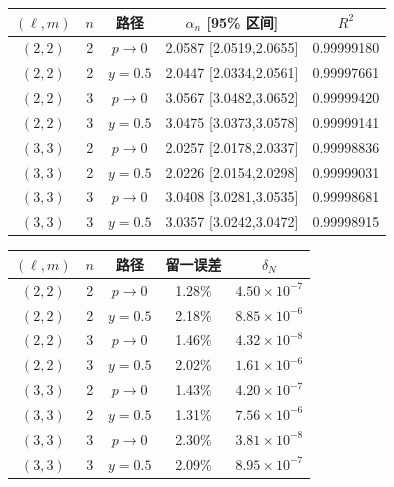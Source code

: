 \documentclass[UTF8,fontset=fandol,12pt,a4paper,oneside,openany]{ctexrep}
\begin{document}
\noindent\begin{minipage}{\linewidth}
\captionsetup{type=table}\caption{历史 principal 模七点幂律拟合审计，待复核。}\label{audit:tab:power-fit-quality}
\centering\fontsize{10.5}{14}\selectfont
\setlength{\tabcolsep}{6pt}\renewcommand{\arraystretch}{1.2}
\par{}\par\smallskip
\begin{tabular}{ccccc}\toprule
$(\ell,m)$ & $n$ & 路径 & $\alpha_n$ [95\% 区间] & $R^2$\\\midrule
$(2,2)$ & 2 & $p\to0$ & 2.0587 [2.0519,2.0655] & 0.99999180\\
$(2,2)$ & 2 & $y=0.5$ & 2.0447 [2.0334,2.0561] & 0.99997661\\
$(2,2)$ & 3 & $p\to0$ & 3.0567 [3.0482,3.0652] & 0.99999420\\
$(2,2)$ & 3 & $y=0.5$ & 3.0475 [3.0373,3.0578] & 0.99999141\\
$(3,3)$ & 2 & $p\to0$ & 2.0257 [2.0178,2.0337] & 0.99998836\\
$(3,3)$ & 2 & $y=0.5$ & 2.0226 [2.0154,2.0298] & 0.99999031\\
$(3,3)$ & 3 & $p\to0$ & 3.0408 [3.0281,3.0535] & 0.99998681\\
$(3,3)$ & 3 & $y=0.5$ & 3.0357 [3.0242,3.0472] & 0.99998915\\
\bottomrule\end{tabular}
\par\medskip
\par{}\par\smallskip
\begin{tabular}{ccccc}\toprule
$(\ell,m)$ & $n$ & 路径 & 留一误差 & $\delta_N$\\\midrule
$(2,2)$ & 2 & $p\to0$ & 1.28\% & $4.50\times10^{-7}$\\
$(2,2)$ & 2 & $y=0.5$ & 2.18\% & $8.85\times10^{-6}$\\
$(2,2)$ & 3 & $p\to0$ & 1.46\% & $4.32\times10^{-8}$\\
$(2,2)$ & 3 & $y=0.5$ & 2.02\% & $1.61\times10^{-6}$\\
$(3,3)$ & 2 & $p\to0$ & 1.43\% & $4.20\times10^{-7}$\\
$(3,3)$ & 2 & $y=0.5$ & 1.31\% & $7.56\times10^{-6}$\\
$(3,3)$ & 3 & $p\to0$ & 2.30\% & $3.81\times10^{-8}$\\
$(3,3)$ & 3 & $y=0.5$ & 2.09\% & $8.95\times10^{-7}$\\
\bottomrule\end{tabular}
\end{minipage}\par\addvspace{10pt}
\end{document}
